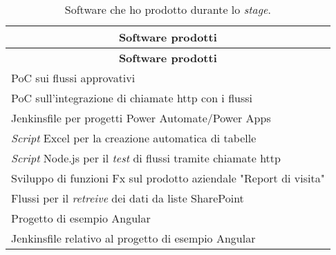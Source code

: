 \begingroup
\renewcommand\arraystretch{1.3}
\begin{longtable}{|p{11cm}|}
    \caption{Software che ho prodotto durante lo \emph{stage}.}
    \label{tab:risultatiQuantitativi}\\
    \hline \multicolumn{1}{|c|}{\textbf{Software prodotti}}\\ \hline \endfirsthead
    \hline \multicolumn{1}{|c|}{\textbf{Software prodotti}}\\ \hline \endhead
    \hline \endfoot
    \hline \endlastfoot
    \hline PoC sui flussi approvativi\\
    \hline PoC sull'integrazione di chiamate \gls{http} con i flussi\\
    \hline Jenkinsfile per progetti Power Automate/Power Apps\\
    \hline \emph{Script} Excel per la creazione automatica di tabelle\\
    \hline \emph{Script} Node.js per il \emph{test} di flussi tramite chiamate \gls{http}\\
    \hline Sviluppo di funzioni Fx sul prodotto aziendale "Report di visita"\\
    \hline Flussi per il \emph{retreive} dei dati da liste SharePoint\\
    \hline Progetto di esempio Angular\\
    \hline Jenkinsfile relativo al progetto di esempio Angular\\
\end{longtable}
\endgroup